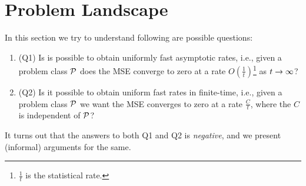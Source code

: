 \section{Problem Landscape}
In this section we try to understand following are possible questions:
\begin{enumerate}[leftmargin=*] 
\item (Q1) Is is possible to obtain uniformly fast asymptotic rates, i.e., given a problem class $\P$ does the MSE converge to zero at a rate $O(\frac{1}{t})$\footnote{$\frac{1}{t}$ is the statistical rate.} as $t\ra\infty$?
\item (Q2) Is it possible to obtain uniform fast rates in finite-time, i.e., given a problem class $\P$ we want the MSE converges to zero at a rate $\frac{C}{t}$, where the $C$ is independent of $\P$?
\end{enumerate}
It turns out that the answers to both Q1 and Q2 is \emph{negative}, and we present (informal) arguments for the same.

